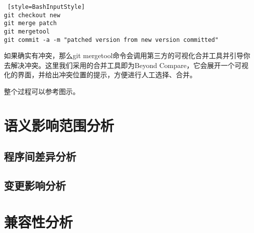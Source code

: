 \begin{lstlisting} [style=BashInputStyle]
git checkout new
git merge patch
git mergetool
git commit -a -m "patched version from new version committed"
\end{lstlisting}

如果确实有冲突，那么git mergetool命令会调用第三方的可视化合并工具并引导你去解决冲突。这里我们采用的合并工具即为Beyond Compare，它会展开一个可视化的界面，并给出冲突位置的提示，方便进行人工选择、合并。

整个过程可以参考图示。

\section{语义影响范围分析}
\subsection{程序间差异分析}
\subsection{变更影响分析}
\section{兼容性分析}